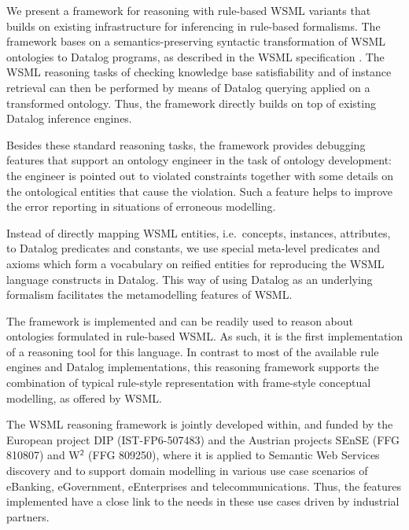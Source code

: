 \smallskip

We present a framework for reasoning with rule-based WSML variants
that builds on existing infrastructure for inferencing in
rule-based formalisms. The framework bases on a
semantics-preserving syntactic transformation of WSML ontologies
to Datalog programs, as described in the WSML specification
\cite{wsml-spec}. The WSML reasoning tasks of checking knowledge
base satisfiability and of instance retrieval can then be
performed by means of Datalog querying applied on a transformed
ontology. Thus, the framework directly builds on top of existing
Datalog inference engines.

Besides these standard reasoning tasks, the framework provides
debugging features that support an ontology engineer in the task
of ontology development: the engineer is pointed out to violated
constraints together with some details on the ontological entities
that cause the violation. Such a feature helps to improve the
error reporting in situations of erroneous modelling.

Instead of directly mapping WSML entities, i.e.\ concepts,
instances, attributes, to Datalog predicates and constants, we use
special meta-level predicates and axioms which form a vocabulary
on reified entities for reproducing the WSML language constructs
in Datalog. This way of using Datalog as an underlying formalism
facilitates the metamodelling features of WSML.

\smallskip

The framework is implemented and can be readily used to reason
about ontologies formulated in rule-based WSML. As such, it is the
first implementation of a reasoning tool for this language. In
contrast to most of the available rule engines and Datalog
implementations, this reasoning framework supports the combination
of typical rule-style representation with frame-style conceptual
modelling, as offered by WSML.

The WSML reasoning framework is jointly developed within, and
funded by the European project DIP (IST-FP6-507483) and the
Austrian projects {SEnSE} (FFG 810807) and {W$^{\mathsf{2}}$} (FFG 809250), where it is applied to Semantic
Web Services discovery and to support domain modelling in various
use case scenarios of eBanking, eGovernment, eEnterprises and
telecommunications. Thus, the features implemented have a close
link to the needs in these use cases driven by industrial
partners.
